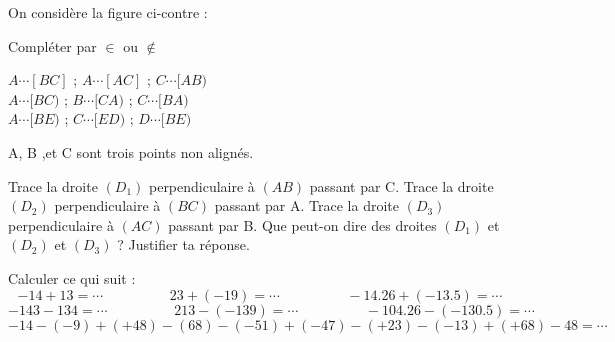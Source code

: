 \documentclass[a4paper,addpoints,12pt]{exam}
\begin{document}
\devoir[prv=false,ds=false,num=2 ,niv=1 , date=01/12/2022,Rdate=12/12/2022 ]

\begin{exo}
\begin{minipage}{.5\linewidth}
On considère la figure ci-contre :
\begin{questions}
\question Compléter par $\in$ ou $\notin$

$A\cdots [BC]$ ; $A\cdots [AC]$ ; $C\cdots [AB)$\\
$A\cdots [BC)$ ; $B\cdots [CA)$ ; $C\cdots [BA)$\\
$A\cdots [BE)$ ; $C\cdots [ED)$ ; $D\cdots [BE)$

\end{questions}
\end{minipage}
\begin{minipage}{.5\linewidth}
\end{minipage}
\end{exo}

\begin{exo}
\begin{minipage}{.6\linewidth}
A, B ,et C sont trois points non alignés. 
\begin{questions}
\question Trace la droite $(D_{1})$ perpendiculaire à $(AB)$ passant par C.
\question Trace la droite $(D_{2})$ perpendiculaire à $(BC)$ passant par A.
\question Trace la droite $(D_{3})$ perpendiculaire à $(AC)$ passant par B.
\question Que peut-on dire des droites $(D_{1})$ et $(D_{2})$ et $(D_{3})$ ? Justifier ta réponse.

\end{questions}
\end{minipage}
\begin{minipage}{.4\linewidth}
\end{minipage}

\end{exo}

\begin{exo}
\begin{questions}
\question Calculer ce qui suit : 
\[-14+13=\cdots \hspace{2cm}
	23+(-19)=\cdots \hspace{2cm}
	-14.26+(-13.5)=\cdots
\]
\[-143-134=\cdots \hspace{2cm}
	213-(-139)=\cdots \hspace{2cm}
	-104.26-(-130.5)=\cdots
\]
\[-14-(-9)+(+48)-(68)-(-51)+(-47)-(+23)-(-13)+(+68)-48=\cdots
\]
\end{questions}

\end{exo}
\end{document}
